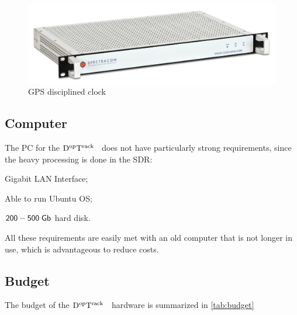 \documentclass[11pt,a4paper,oneside]{article}
\newcommand{\GroundStationName}{${\rm D^{\rm op}T^{\rm rack}}$}
\newcommand{\fulltextwidth}{\textwidth}
\newcommand{\listskip}{0pt}
\newenvironment{itemize*}
{\begin{itemize}
  \setlength{\itemsep}{\listskip}
  \setlength{\parskip}{\listskip}
  \setlength{\parsep}{\listskip}}
{\end{itemize}}
\newcommand{\unit}[2]{$ {\sf #1}\thickspace{\sf #2}$}
\begin{document}
\begin{figure}[!ht]
\centering
\includegraphics[width=\fulltextwidth]{clock}
\caption{\acs{GPS} disciplined clock}
\label{fig:clock}
\end{figure}



\subsection{Computer}

The \ac{PC} for the \GroundStationName~ does not have particularly strong requirements, since the heavy processing is done in the \ac{SDR}:

\begin{itemize*}
\item Gigabit \ac{LAN} Interface;
\item Able to run Ubuntu \ac{OS};
\item \unit{200-500}{Gb} hard disk.
\end{itemize*}

All these requirements are easily met with an old computer that is not longer in use, which is advantageous to reduce costs.



\subsection{Budget}

The budget of the \GroundStationName~ hardware is summarized in \ref{tab:budget}

\newcommand{\tablerow}[1]{\details{#1}{name} & \details{#1}{model} & \details{#1}{quant} & \details{#1}{price} \\}
\end{document}

